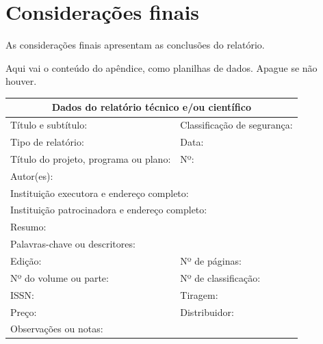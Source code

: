 \documentclass[12pt,a4paper,oneside]{article}
\begin{document}
\section{Considerações finais}

As considerações finais apresentam as conclusões do relatório.



Aqui vai o conteúdo do apêndice, como planilhas de dados. Apague se não houver.

{\abntmenor
\noindent\begin{tabular}{|p{}|p{}|}
  \hline
  \multicolumn{2}{|c|}{\textbf{Dados do relatório técnico e/ou científico}} \\ \hline
  Título e subtítulo: & Classificação de segurança: \\ \hline
  Tipo de relatório: & Data: \\ \hline
  Título do projeto, programa ou plano: & Nº: \\ \hline
  \multicolumn{2}{|p{0.96\textwidth}|}{Autor(es):} \\ \hline
  \multicolumn{2}{|p{0.96\textwidth}|}{Instituição executora e endereço completo:} \\ \hline
  \multicolumn{2}{|p{0.96\textwidth}|}{Instituição patrocinadora e endereço completo:} \\ \hline
  \multicolumn{2}{|p{0.96\textwidth}|}{Resumo:\vspace{2cm}} \\ \hline
  \multicolumn{2}{|p{0.96\textwidth}|}{Palavras-chave ou descritores:} \\ \hline
  Edição: & Nº de páginas: \\ \hline
  Nº do volume ou parte: & Nº de classificação: \\ \hline
  ISSN: & Tiragem: \\ \hline
  Preço: & Distribuidor: \\ \hline
  \multicolumn{2}{|p{0.96\textwidth}|}{Observações ou notas:} \\ \hline
\end{tabular}\par}
\end{document}
